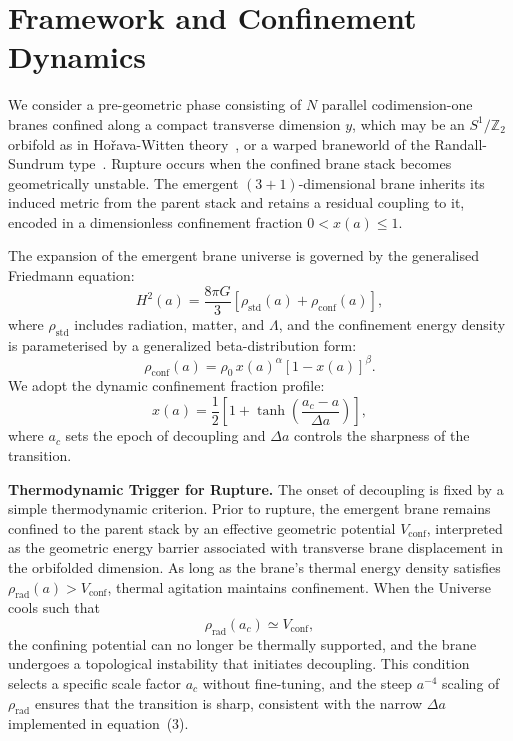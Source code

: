 \documentclass[11pt,a4paper,twocolumn]{article}
\begin{document}
\section{Framework and Confinement Dynamics}
\label{sec:framework}
We consider a pre-geometric phase consisting of $N$ parallel codimension-one branes confined along a compact transverse dimension $y$, which may be an $S^1/\mathbb{Z}_2$ orbifold as in Ho\v{r}ava-Witten theory~\cite{horava1996}, or a warped braneworld of the Randall-Sundrum type~\cite{randall1999}. Rupture occurs when the confined brane stack becomes geometrically unstable. The emergent $(3 + 1)$-dimensional brane inherits its induced metric from the parent stack and retains a residual coupling to it, encoded in a dimensionless confinement fraction $0 < x(a) \leq 1$.

The expansion of the emergent brane universe is governed by the generalised Friedmann equation:
\begin{equation}
H^2(a) = \frac{8\pi G}{3} \left[ \rho_{\text{std}}(a) + \rho_{\text{conf}}(a) \right],
\end{equation}
where $\rho_{\text{std}}$ includes radiation, matter, and $\Lambda$, and the confinement energy density is parameterised by a generalized beta-distribution form:
\begin{equation}
\rho_{\text{conf}}(a) = \rho_0\, x(a)^{\alpha} [1 - x(a)]^{\beta}.
\end{equation}
We adopt the dynamic confinement fraction profile:
\begin{equation}
x(a) = \frac{1}{2} \left[ 1 + \tanh \left( \frac{a_c - a}{\Delta a} \right) \right],
\end{equation}
where $a_c$ sets the epoch of decoupling and $\Delta a$ controls the sharpness of the transition.

\noindent\textbf{Thermodynamic Trigger for Rupture.}
The onset of decoupling is fixed by a simple thermodynamic criterion. Prior to rupture, the emergent brane remains confined to the parent stack by an effective geometric potential $V_{\text{conf}}$, interpreted as the geometric energy barrier associated with transverse brane displacement in the orbifolded dimension. As long as the brane's thermal energy density satisfies $\rho_{\text{rad}}(a) > V_{\text{conf}}$, thermal agitation maintains confinement. When the Universe cools such that
\begin{equation}
\rho_{\text{rad}}(a_c) \simeq V_{\text{conf}},
\end{equation}
the confining potential can no longer be thermally supported, and the brane undergoes a topological instability that initiates decoupling. This condition selects a specific scale factor $a_c$ without fine-tuning, and the steep $a^{-4}$ scaling of $\rho_{\text{rad}}$ ensures that the transition is sharp, consistent with the narrow $\Delta a$ implemented in equation~(3).
\end{document}
